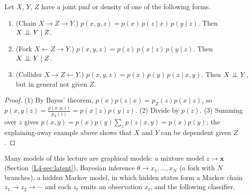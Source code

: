 \begin{proposition}\label{L4-prop:three-graphs}
    Let $X$, $Y$, $Z$ have a joint pmf or density of one of the following forms.
    \begin{enumerate}
        \item (Chain $X \to Z \to Y$.) $p(x, y, z) = p(x)\,p(z \mid x)\,p(y \mid z)$. Then $X \perp\!\!\!\perp Y \mid Z$.
        \item (Fork $X \leftarrow Z \to Y$.) $p(x, y, z) = p(z)\,p(x \mid z)\,p(y \mid z)$. Then $X \perp\!\!\!\perp Y \mid Z$.
        \item (Collider $X \to Z \leftarrow Y$.) $p(x, y, z) = p(x)\,p(y)\,p(z \mid x, y)$. Then $X \perp\!\!\!\perp Y$, but in general not given $Z$.
    \end{enumerate}
\end{proposition}

\begin{proof}
    (1) By Bayes' theorem, $p(x)p(z \mid x) = p_Z(z)p(x \mid z)$, so $p(x, y \mid z) = \frac{p(x, y, z)}{p_Z(z)} = p(x \mid z)p(y \mid z)$. (2) Divide by $p(z)$. (3) Summing over $z$ gives $p(x, y) = p(x)p(y)\sum_z p(z \mid x, y) = p(x)p(y)$; the explaining-away example above shows that $X$ and $Y$ can be dependent given $Z$.
\end{proof}

Many models of this lecture are graphical models: a mixture model $z \to \mathbf{x}$ (Section~\ref{L4-sec:latent}), Bayesian inference $\theta \to x_1, \ldots, x_N$ (a fork with $N$ branches), a hidden Markov model, in which hidden states form a Markov chain $z_1 \to z_2 \to \cdots$ and each $z_t$ emits an observation $x_t$, and the following classifier.

